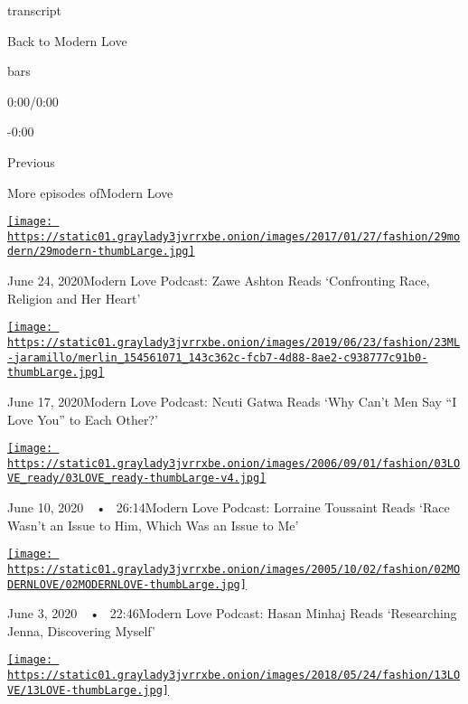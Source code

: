 transcript

Back to Modern Love

bars

0:00/0:00

-0:00

Previous

More episodes ofModern Love

\href{https://www.nytimes3xbfgragh.onion/2020/06/24/style/modern-love-podcast-zawe-ashton.html?action=click\&module=audio-series-bar\&region=header\&pgtype=Article}{\texttt{[image: https://static01.graylady3jvrrxbe.onion/images/2017/01/27/fashion/29modern/29modern-thumbLarge.jpg]}}

June 24, 2020Modern Love Podcast: Zawe Ashton Reads `Confronting Race,
Religion and Her Heart'

\href{https://www.nytimes3xbfgragh.onion/2020/06/17/style/modern-love-podcast-ncuti-gatwa.html?action=click\&module=audio-series-bar\&region=header\&pgtype=Article}{\texttt{[image: https://static01.graylady3jvrrxbe.onion/images/2019/06/23/fashion/23ML-jaramillo/merlin\_154561071\_143c362c-fcb7-4d88-8ae2-c938777c91b0-thumbLarge.jpg]}}

June 17, 2020Modern Love Podcast: Ncuti Gatwa Reads `Why Can't Men Say
``I Love You'' to Each Other?'

\href{https://www.nytimes3xbfgragh.onion/2020/06/10/style/modern-love-podcast-lorraine-toussant-updated-poscript.html?action=click\&module=audio-series-bar\&region=header\&pgtype=Article}{\texttt{[image: https://static01.graylady3jvrrxbe.onion/images/2006/09/01/fashion/03LOVE\_ready/03LOVE\_ready-thumbLarge-v4.jpg]}}

June 10, 2020~~•~ 26:14Modern Love Podcast: Lorraine Toussaint Reads
`Race Wasn't an Issue to Him, Which Was an Issue to Me'

\href{https://www.nytimes3xbfgragh.onion/2020/06/03/style/modern-love-podcast-hasan-minhaj.html?action=click\&module=audio-series-bar\&region=header\&pgtype=Article}{\texttt{[image: https://static01.graylady3jvrrxbe.onion/images/2005/10/02/fashion/02MODERNLOVE/02MODERNLOVE-thumbLarge.jpg]}}

June 3, 2020~~•~ 22:46Modern Love Podcast: Hasan Minhaj Reads
`Researching Jenna, Discovering Myself'

\href{https://www.nytimes3xbfgragh.onion/2020/05/27/style/modern-love-podcast-saoirse-ronan.html?action=click\&module=audio-series-bar\&region=header\&pgtype=Article}{\texttt{[image: https://static01.graylady3jvrrxbe.onion/images/2018/05/24/fashion/13LOVE/13LOVE-thumbLarge.jpg]}}

